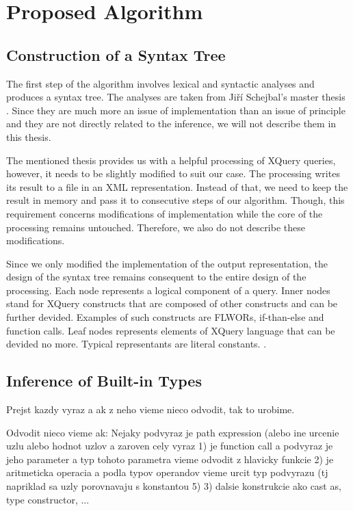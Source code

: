 \chapter{Proposed Algorithm}

\section{Construction of a Syntax Tree}
The first step of the algorithm involves lexical and syntactic analyses and produces a syntax tree. The analyses are taken from Ji\v r\'{i} Schejbal's master thesis . Since they are much more an issue of implementation than an issue of principle and they are not directly related to the inference, we will not describe them in this thesis.

The mentioned thesis provides us with a helpful processing of XQuery queries, however, it needs to be slightly modified to suit our case. The processing writes its result to a file in an XML representation. Instead of that, we need to keep the result in memory and pass it to consecutive steps of our algorithm. Though, this requirement concerns modifications of implementation while the core of the processing remains untouched. Therefore, we also do not describe these modifications.

Since we only modified the implementation of the output representation, the design of the syntax tree remains consequent to the entire design of the processing. Each node represents a logical component of a query. Inner nodes stand for XQuery constructs that are composed of other constructs and can be further devided. Examples of such constructs are FLWORs, if-than-else and function calls. Leaf nodes represents elements of XQuery language that can be devided no more. Typical representants are literal constants. .


\section{Inference of Built-in Types}
Prejst kazdy vyraz a ak z neho vieme nieco odvodit, tak to urobime.

Odvodit nieco vieme ak:
Nejaky podvyraz je path expression (alebo ine urcenie uzlu alebo hodnot uzlov 
a zaroven cely vyraz
1) je function call a podvyraz je jeho parameter a typ tohoto parametra vieme odvodit z hlavicky funkcie
2) je aritmeticka operacia a podla typov operandov vieme urcit typ podvyrazu (tj napriklad sa uzly porovnavaju s konstantou 5) 
3) dalsie konstrukcie ako cast as, type constructor, ... 



